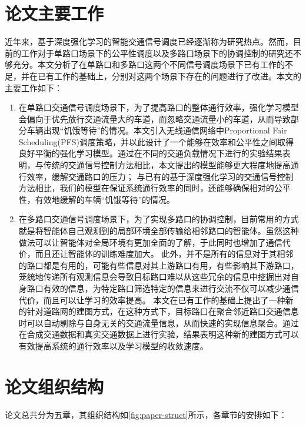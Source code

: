 \section{论文主要工作}
近年来，基于深度强化学习的智能交通信号调度已经逐渐称为研究热点。然而，目前的工作对于单路口场景下的公平性调度以及多路口场景下的协调控制的研究还不够充分。本文分析了在单路口和多路口这两个不同信号调度场景下已有工作的不足，并在已有工作的基础上，分别对这两个场景下存在的问题进行了改进。本文的主要工作如下：
\begin{enumerate}
    \item 在单路口交通信号调度场景下，为了提高路口的整体通行效率，强化学习模型会偏向于优先放行交通流量大的车道，而忽略交通流量小的车道，从而导致部分车辆出现“饥饿等待”的情况。本文引入无线通信网络中Proportional Fair Scheduling(PFS)调度策略，并以此设计了一个能够在效率和公平性之间取得良好平衡的强化学习模型。通过在不同的交通负载情况下进行的实验结果表明，与传统的交通信号控制方法相比，本文提出的模型能够更大程度地提高通行效率，缓解交通路口的压力；
    与已有的基于深度强化学习的交通信号控制方法相比，我们的模型在保证系统通行效率的同时，还能够确保相对的公平性，有效地缓解的车辆“饥饿等待”的情况。
    \item 在多路口交通信号调度场景下，为了实现多路口的协调控制，目前常用的方式就是将智能体自己观测到的局部环境全部传输给相邻路口的智能体。虽然这种做法可以让智能体对全局环境有更加全面的了解，于此同时也增加了通信代价，而且还让智能体的训练难度加大。
    此外，并不是所有的信息对于其相邻的路口都是有用的，可能有些信息对其上游路口有用，有些影响其下游路口，笼统地传递所有观测信息会导致目标路口难以从这些冗余的信息中挖掘出对自身路口有效的信息，为特定路口筛选特定的信息来进行交流不仅可以减少通信代价，而且可以让学习的效率提高。
    本文在已有工作的基础上提出了一种新的针对道路网的建图方式，在这种方式下，目标路口在聚合邻近路口交通信息时可以自动剔除与自身无关的交通流量信息，从而快速的实现信息聚合。通过在合成交通数据和真实交通数据上进行实验，结果表明这种新的建图方式可以有效提高系统的通行效率以及学习模型的收敛速度。
\end{enumerate}
\section{论文组织结构}
论文总共分为五章，其组织结构如\autoref{fig:paper-struct}所示，各章节的安排如下：

